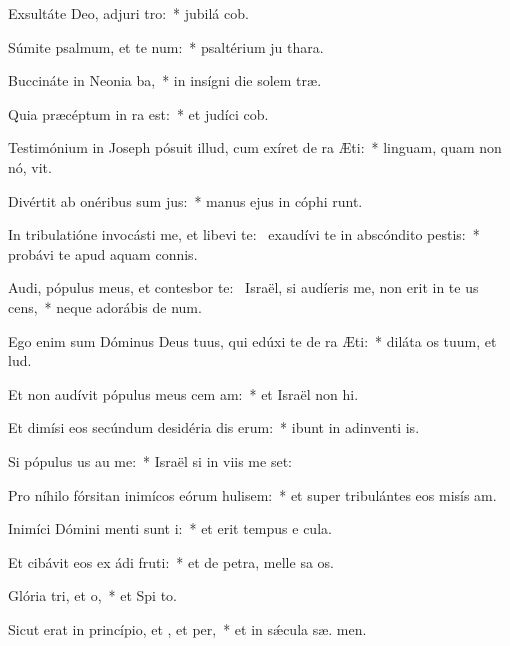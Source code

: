 \item Exsultáte Deo, adjuri tro:~* jubilá  cob.
\item Súmite psalmum, et te num:~* psaltérium ju  thara.
\item Buccináte in Neonia ba,~* in insígni die solem træ.
\item Quia præcéptum in ra est:~* et judíci  cob.
\item Testimónium in Joseph pósuit illud, cum exíret de ra Æti:~* linguam, quam non nó, vit.
\item Divértit ab onéribus sum jus:~* manus ejus in cóphi runt.
\item In tribulatióne invocásti me, et libevi te:~\pscross{} exaudívi te in abscóndito pestis:~* probávi te apud aquam connis.
\item Audi, pópulus meus, et contesbor te:~\pscross{} Israël, si audíeris me, non erit in te us cens,~* neque adorábis de num.
\item Ego enim sum Dóminus Deus tuus, qui edúxi te de ra Æti:~* diláta os tuum, et  lud.
\item Et non audívit pópulus meus cem am:~* et Israël non  hi.
\item Et dimísi eos secúndum desidéria dis erum:~* ibunt in adinventi is.
\item Si pópulus us au me:~* Israël si in viis me set:
\item Pro níhilo fórsitan inimícos eórum hulisem:~* et super tribulántes eos misís  am.
\item Inimíci Dómini menti sunt i:~* et erit tempus e  cula.
\item Et cibávit eos ex ádi fruti:~* et de petra, melle sa os.
\item Glória tri, et o,~* et Spi to.
\item Sicut erat in princípio, et , et per,~* et in sǽcula sæ. men.
